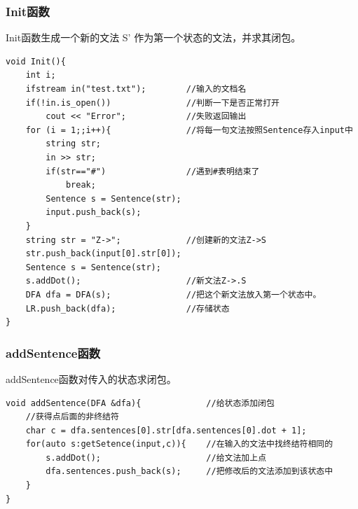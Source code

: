 \documentclass{ctexrep}
\begin{document}
\subsubsection{Init函数}
Init函数生成一个新的文法 S' 作为第一个状态的文法，并求其闭包。
\begin{verbatim}
void Init(){
    int i;
    ifstream in("test.txt");        //输入的文档名
    if(!in.is_open())               //判断一下是否正常打开
        cout << "Error";            //失败返回输出
    for (i = 1;;i++){               //将每一句文法按照Sentence存入input中
        string str;
        in >> str;
        if(str=="#")                //遇到#表明结束了
            break;
        Sentence s = Sentence(str);
        input.push_back(s);
    }
    string str = "Z->";             //创建新的文法Z->S
    str.push_back(input[0].str[0]);
    Sentence s = Sentence(str);
    s.addDot();                     //新文法Z->.S
    DFA dfa = DFA(s);               //把这个新文法放入第一个状态中。
    LR.push_back(dfa);              //存储状态
}
\end{verbatim}
\subsubsection{addSentence函数}
addSentence函数对传入的状态求闭包。
\begin{verbatim}
void addSentence(DFA &dfa){             //给状态添加闭包
    //获得点后面的非终结符
    char c = dfa.sentences[0].str[dfa.sentences[0].dot + 1];
    for(auto s:getSetence(input,c)){    //在输入的文法中找终结符相同的
        s.addDot();                     //给文法加上点
        dfa.sentences.push_back(s);     //把修改后的文法添加到该状态中
    }
}
\end{verbatim}
\end{document}
